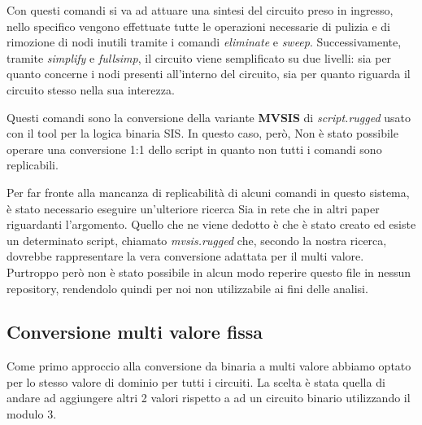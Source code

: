 \documentclass[
]{book}
\begin{document}
Con questi comandi si va ad attuare una sintesi del circuito preso in ingresso, nello specifico vengono effettuate tutte le operazioni necessarie di pulizia e di rimozione di nodi inutili tramite i comandi \emph{eliminate} e \emph{sweep}. Successivamente, tramite \emph{simplify} e \emph{fullsimp}, il circuito viene semplificato su due livelli: sia per quanto concerne i nodi presenti all'interno del circuito, sia per quanto riguarda il circuito stesso nella sua interezza.

Questi comandi sono la conversione della variante \textbf{MVSIS} di \emph{script.rugged} usato con il tool per la logica binaria SIS. In questo caso, però, Non è stato possibile operare una conversione 1:1 dello script in quanto non tutti i comandi sono replicabili.

Per far fronte alla mancanza di replicabilità di alcuni comandi in questo sistema, è stato necessario eseguire un'ulteriore ricerca Sia in rete che in altri paper riguardanti l'argomento. Quello che ne viene dedotto è che è stato creato ed esiste un determinato script, chiamato \emph{mvsis.rugged} che, secondo la nostra ricerca, dovrebbe rappresentare la vera conversione adattata per il multi valore. Purtroppo però non è stato possibile in alcun modo reperire questo file in nessun repository, rendendolo quindi per noi non utilizzabile ai fini delle analisi.

\newpage

\hypertarget{conversione-multi-valore-fissa}{%
\subsection{Conversione multi valore fissa}\label{conversione-multi-valore-fissa}}

Come primo approccio alla conversione da binaria a multi valore abbiamo optato per lo stesso valore di dominio per tutti i circuiti. La scelta è stata quella di andare ad aggiungere altri 2 valori rispetto a ad un circuito binario utilizzando il modulo 3.
\end{document}
